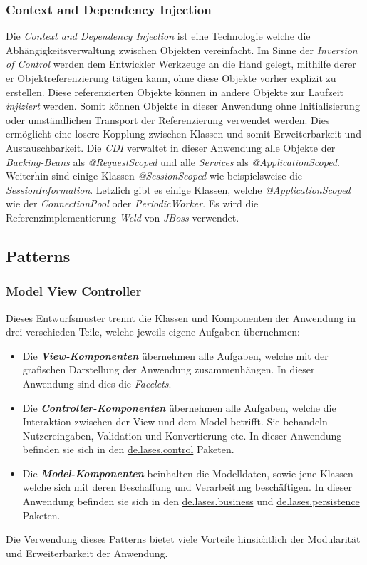 \subsubsection{Context and Dependency Injection}
Die \emph{Context and Dependency Injection} ist eine Technologie welche die
Abhängigkeitsverwaltung zwischen Objekten vereinfacht. Im Sinne der
\emph{Inversion of Control} werden dem Entwickler Werkzeuge an die Hand gelegt, mithilfe derer
er Objektreferenzierung tätigen kann, ohne diese Objekte vorher explizit zu erstellen.
Diese referenzierten Objekte können in andere Objekte zur Laufzeit \emph{injiziert} werden.
Somit können Objekte in dieser Anwendung ohne Initialisierung oder umständlichen Transport der Referenzierung
verwendet werden.
Dies ermöglicht eine losere Kopplung zwischen Klassen und somit Erweiterbarkeit
und Austauschbarkeit.
Die \emph{CDI} verwaltet in dieser Anwendung alle Objekte der \emph{\hyperref[arch:backing]{Backing-Beans}}
als \emph{@RequestScoped}
und alle \emph{\hyperref[arch:service]{Services}} als \emph{@ApplicationScoped}.
Weiterhin sind einige Klassen \emph{@SessionScoped} wie beispielsweise
die \emph{SessionInformation}.
Letzlich gibt es einige Klassen, welche
\emph{@ApplicationScoped} wie der \emph{ConnectionPool} oder \emph{PeriodicWorker}.%
Es wird die Referenzimplementierung \emph{Weld} von \emph{JBoss} verwendet.

\subsection{Patterns}\label{arch:patterns}

\subsubsection{Model View Controller}\label{arch:mvc}
Dieses Entwurfsmuster trennt die Klassen und Komponenten der Anwendung in drei
verschieden Teile, welche jeweils eigene Aufgaben übernehmen:
\begin{itemize}
    \item Die \emph{\textbf{View-Komponenten}} übernehmen alle Aufgaben,
    welche mit der grafischen Darstellung der Anwendung zusammenhängen.
    In dieser Anwendung sind dies die \emph{Facelets}. %
    \item Die \emph{\textbf{Controller-Komponenten}} übernehmen alle Aufgaben,
    welche die Interaktion zwischen der View und dem Model betrifft. Sie behandeln
    Nutzereingaben, Validation und Konvertierung etc. In dieser Anwendung befinden sie
    sich in den \hyperref[arch:control]{de.lases.control} Paketen.
    \item Die \emph{\textbf{Model-Komponenten}} beinhalten die Modelldaten, sowie jene
    Klassen welche sich mit deren Beschaffung und Verarbeitung beschäftigen. In dieser
    Anwendung befinden sie sich in den \hyperref[arch:business]{de.lases.business}
    und \hyperref[arch:persistence]{de.lases.persistence} Paketen.
\end{itemize}
Die Verwendung dieses Patterns bietet viele Vorteile hinsichtlich der Modularität
und Erweiterbarkeit der Anwendung.

